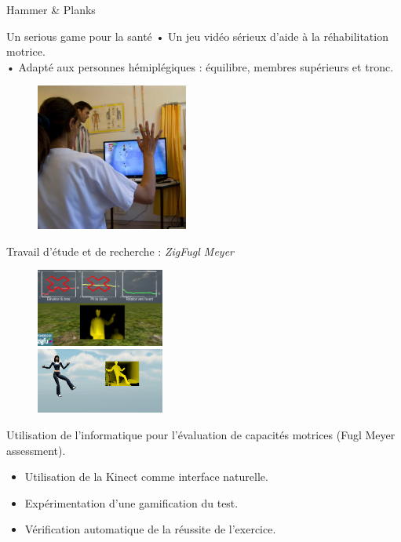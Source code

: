 \documentclass{beamer}
\begin{document}
	\begin{frame}{Hammer \& Planks}
		\begin{block}{Un serious game pour la santé}
			• Un jeu vidéo sérieux d'aide à la réhabilitation motrice.\\
			• Adapté aux personnes hémiplégiques : équilibre, membres supérieurs et tronc.
		\end{block}
		
		\begin{figure}
			\includegraphics[width=5cm]{../images/test_lapeyronie_2.png}
		\end{figure}
	\end{frame}	
	
	\begin{frame}{Travail d'étude et de recherche : \emph{ZigFugl Meyer}}
		\begin{minipage}{0.40\linewidth}
			\begin{figure}
				\includegraphics[width=4.2cm]{../images/zigfugl-meyer_1.png}\\
				\includegraphics[width=4.2cm]{../images/zigfugl-meyer_2.png}
			\end{figure}
		\end{minipage}
		\begin{minipage}{6cm}%
			Utilisation de l'informatique pour l'évaluation de capacités motrices (Fugl Meyer assessment). 
				\begin{itemize}
					\item Utilisation de la Kinect comme interface naturelle.
					\item Expérimentation d'une gamification du test.
					\item Vérification automatique de la réussite de l'exercice.
				\end{itemize}
		\end{minipage}
	\end{frame}
\end{document}
